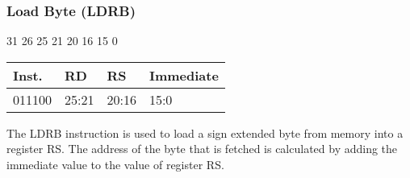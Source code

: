 \documentclass[12pt]{article}
\begin{document}

    \newpage
    \subsubsection{Load Byte (LDRB)}
    
    \hspace{1.6cm}31 \hspace{1.15cm}26 \hspace{.05cm}25 \hspace{.8cm}21 \hspace{.05cm}20 \hspace{.8cm}16 \hspace{.05cm}15 \hspace{6.4cm}0
    \vspace{-.25cm}
    \begin{center}
        \begin{tabular}{ |p{1.8cm}|p{1.5cm}|p{1.5cm}|p{6.8cm}| }
            \hline
            \textbf{Inst.} & \textbf{RD} &  \textbf{RS} & \textbf{Immediate}\\
            \hline
            011100& 25:21 & 20:16 &15:0\\
            \hline
        \end{tabular}
    \end{center}
    
    \noindent
    The LDRB instruction is used to load a sign extended byte from memory into a register RS. The address of the byte that is fetched is calculated by adding the immediate value to the value of register RS. 
    
\end{document}
